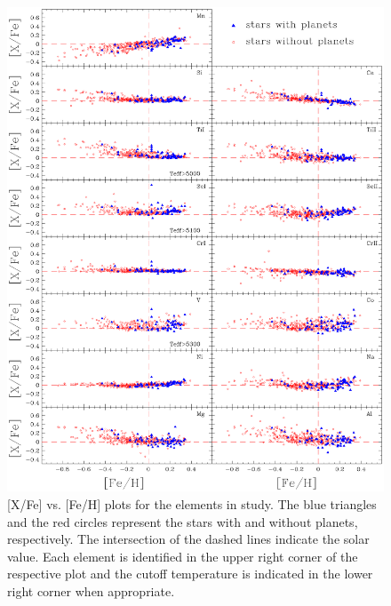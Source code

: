\documentclass[oldversion]{aa}
\begin{document}
\begin{figure}[t!]
\centering
\includegraphics[trim=0cm 1.3cm 0cm 1.3cm,clip,width=17 cm]{pics/xfefehpaperv2.eps}
\caption[abundance gfx]{[X/Fe] vs. [Fe/H] plots for the elements in study. The blue triangles and the red circles represent the stars with and without planets, respectively. The intersection of the dashed lines indicate the solar value. Each element is identified in the upper right corner of the respective plot and the cutoff temperature is indicated in the lower right corner when appropriate.} %
\label{fig:xfefeh1}
\end{figure}


\end{document}
